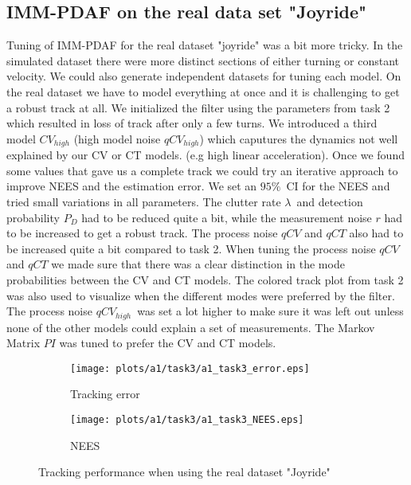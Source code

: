 \subsection{IMM-PDAF on the real data set "Joyride"}
Tuning of IMM-PDAF for the real dataset "joyride" was a bit more tricky. In the simulated dataset there were more distinct sections of either turning or constant velocity. We could also generate independent datasets for tuning each model. On the real dataset we have to model everything at once and it is challenging to get a robust track at all. We initialized the filter using the parameters from task 2 which resulted in loss of track after only a few turns. We introduced a third model $CV_{high}$ (high model noise $qCV_{high}$) which caputures the dynamics not well explained by our CV or CT models. (e.g high linear acceleration). Once we found some values that gave us a complete track we could try an iterative approach to improve NEES and the estimation error. We set an $95\%$ CI for the NEES and tried small variations in all parameters. The clutter rate $\lambda$ and detection probability $P_D$ had to be reduced quite a bit, while the measurement noise $r$ had to be increased to get a robust track. The process noise $qCV$ and $qCT$ also had to be increased quite a bit compared to task 2. When tuning the process noise $qCV$ and $qCT$ we made sure that there was a clear distinction in the mode probabilities between the CV and CT models. The colored track plot from task 2 was also used to visualize when the different modes were preferred by the filter. The process noise $qCV_{high}$ was set a lot higher to make sure it was left out unless none of the other models could explain a set of measurements.
The Markov Matrix $PI$ was tuned to prefer the CV and CT models.
\begin{figure}
    \centering
    \hspace*{-2cm}\begin{adjustbox}{minipage=\linewidth, scale=1}
        \begin{subfigure}{.5\textwidth}
            \texttt{[image: plots/a1/task3/a1\_task3\_error.eps]}
            \caption{Tracking error}
            \label{fig:task3_tracking_error}
        \end{subfigure}
        \begin{subfigure}{.5\textwidth}
            \texttt{[image: plots/a1/task3/a1\_task3\_NEES.eps]}
            \caption{NEES}
            \label{fig:task3_NEES}
        \end{subfigure}
    \end{adjustbox}
        \caption{Tracking performance when using the real dataset "Joyride"}
\end{figure}
